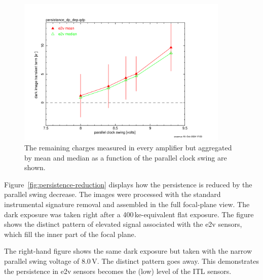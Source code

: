 \begin{figure}
\begin{centering}
\includegraphics[width=0.9\textwidth]{figures/e2v_transient_dark_vs_dp.png}

\caption{The remaining charges measured in every amplifier but
aggregated by mean and median as a function of the parallel clock swing
are shown.}
\label{fig:peristence-swing}
\end{centering}
\end{figure}

Figure~\ref{fig:persistence-reduction} displays how the persistence is reduced by the
parallel swing decrease. The images were processed with the standard instrumental
signature removal and assembled in the full focal-plane view. The
dark exposure was taken right after a 400\,ke-equivalent flat exposure.
The figure shows the distinct pattern of elevated signal associated with
the e2v sensors, which fill the inner part of the focal plane.

The right-hand figure shows the same dark exposure but taken with the narrow
parallel swing voltage of 8.0\,V. The distinct pattern goes away. This
demonstrates the persistence in e2v sensors becomes the (low) level of the 
ITL sensors.


